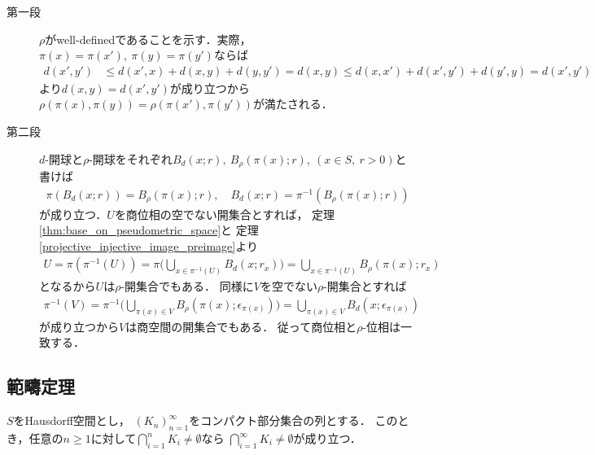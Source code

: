	\begin{prf}\mbox{}
		\begin{description}
			\item[第一段] $\rho$がwell-definedであることを示す．実際，
				$\pi(x) = \pi(x'),\ \pi(y) = \pi(y')$ならば
				\begin{align}
					d(x',y') &\leq d(x',x) + d(x,y) + d(y,y') = d(x,y)
					\leq d(x,x') + d(x',y') + d(y',y) = d(x',y')
				\end{align}
				より$d(x,y) = d(x',y')$が成り立つから
				$\rho(\pi(x),\pi(y)) = \rho(\pi(x'),\pi(y'))$が満たされる．
				
			\item[第二段] $d$-開球と$\rho$-開球をそれぞれ$B_d(x;r),\ B_\rho(\pi(x);r),
				\ (x \in S,\ r>0)$と書けば
				\begin{align}
					\pi\left(B_d(x;r)\right) = B_\rho(\pi(x);r),
					\quad B_d(x;r) = \pi^{-1}\left(B_\rho(\pi(x);r)\right)
				\end{align}
				が成り立つ．$U$を商位相の空でない開集合とすれば，
				定理\ref{thm:base_on_pseudometric_space}と
				定理\ref{projective_injective_image_preimage}より
				\begin{align}
					U = \pi\left(\pi^{-1}(U)\right)
					= \pi\Biggl(\bigcup_{x \in \pi^{-1}(U)}B_d(x;r_x)\Biggr)
					= \bigcup_{x \in \pi^{-1}(U)} B_\rho(\pi(x);r_x)
				\end{align}
				となるから$U$は$\rho$-開集合でもある．
				同様に$V$を空でない$\rho$-開集合とすれば
				\begin{align}
					\pi^{-1}(V)
					= \pi^{-1}\Biggl(\bigcup_{\pi(x) \in V} B_\rho\left(\pi(x);\epsilon_{\pi(x)}\right)\Biggr)
					= \bigcup_{\pi(x) \in V} B_d\left(x;\epsilon_{\pi(x)}\right)
				\end{align}
				が成り立つから$V$は商空間の開集合でもある．
				従って商位相と$\rho$-位相は一致する．
				\QED
		\end{description}
	\end{prf}
	
\subsection{範疇定理}
	\begin{screen}
		\begin{thm}[Cantorの共通部分定理]\label{thm:Cantor_intersection_theorem}
			$S$をHausdorff空間とし，
			$(K_n)_{n=1}^\infty$をコンパクト部分集合の列とする．
			このとき，任意の$n \geq 1$に対して$\bigcap_{i=1}^n K_i \neq \emptyset$なら
			$\bigcap_{i=1}^\infty K_i \neq \emptyset$が成り立つ．
		\end{thm}
	\end{screen}
	
